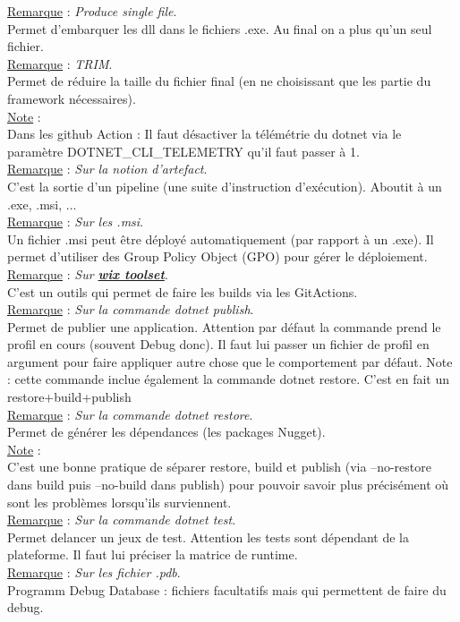 \documentclass[a4paper,12pt,twoside]{article}
\newcommand{\urlcolor}{magenta}  %
\newcommand{\keycolor}{purple} %
\newcommand{\rem}[2]{\noindent\underline{Remarque} : \textit{#1}.\\ \indent #2}
\newcommand{\note}[1]{\noindent\underline{Note} : \\ \indent #1}
\newcommand{\keyref}[2]{\hypersetup{urlcolor=\keycolor} \href{#1}{\textbf{#2}}\hypersetup{urlcolor=\urlcolor}}
\begin{document}
\rem{Produce single file}{Permet d'embarquer les dll dans le fichiers .exe. Au final on a plus qu'un seul fichier.}\\

\rem{TRIM}{Permet de réduire la taille du fichier final (en ne choisissant que les partie du framework nécessaires).}\\

\note{Dans les github Action : Il faut désactiver la télémétrie du dotnet via le paramètre DOTNET\_CLI\_TELEMETRY qu'il faut passer à 1.}\\

\rem{Sur la notion d'artefact}{C'est la sortie d'un pipeline (une suite d'instruction d'exécution). Aboutit à un .exe, .msi, ...}\\

\rem{Sur les .msi}{Un fichier .msi peut être déployé automatiquement (par rapport à un .exe). Il permet d'utiliser des Group Policy Object (GPO) pour gérer le déploiement.}\\

\rem{Sur \keyref{https://wixtoolset.org/}{wix toolset}}{C'est un outils qui permet de faire les builds via les GitActions.}\\

\rem{Sur la commande dotnet publish}{Permet de publier une application. Attention par défaut la commande prend le profil en cours (souvent Debug donc). Il faut lui passer un fichier de profil en argument pour faire appliquer autre chose que le comportement par défaut. Note : cette commande inclue également la commande dotnet restore. C'est en fait un restore+build+publish}\\

\rem{Sur la commande dotnet restore}{Permet de générer les dépendances (les packages Nugget).}\\

\note{C'est une bonne pratique de séparer restore, build et publish (via --no-restore dans build puis --no-build dans publish) pour pouvoir savoir plus précisément où sont les problèmes lorsqu'ils surviennent.}\\

\rem{Sur la commande dotnet test}{Permet delancer un jeux de test. Attention les tests sont dépendant de la plateforme. Il faut lui préciser la matrice de runtime.}\\

\rem{Sur les fichier .pdb}{Programm Debug Database : fichiers facultatifs mais qui permettent de faire du debug.}\\
\end{document}
